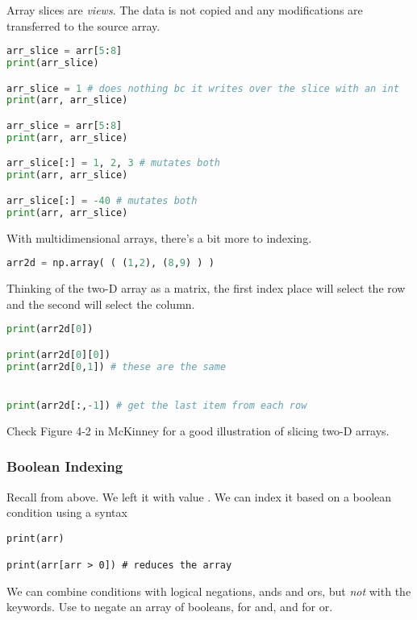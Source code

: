 \noindent Array slices are \emph{views}. The data is not copied and any modifications are transferred to the source array.

\begin{lstlisting}[language = Python]
arr_slice = arr[5:8]
print(arr_slice)

arr_slice = 1 # does nothing bc it writes over the slice with an int
print(arr, arr_slice)

arr_slice = arr[5:8]
print(arr, arr_slice)

arr_slice[:] = 1, 2, 3 # mutates both
print(arr, arr_slice)

arr_slice[:] = -40 # mutates both
print(arr, arr_slice)
\end{lstlisting}

\smallskip
\noindent With multidimensional arrays, there's a bit more to indexing.

\begin{lstlisting}[language = Python]
arr2d = np.array( ( (1,2), (8,9) ) ) 
\end{lstlisting}

Thinking of the two-D array as a matrix, the first index place will select the row and the second will select the column.

\begin{lstlisting}[language = Python]
print(arr2d[0])

print(arr2d[0][0])
print(arr2d[0,1]) # these are the same


print(arr2d[:,-1]) # get the last item from each row
\end{lstlisting}

\noindent Check Figure 4-2 in McKinney for a good illustration of slicing two-D arrays.


\subsubsection{Boolean Indexing}

Recall  from above. We left it with value . We can index it based on a boolean condition using a syntax 

\begin{lstlisting}
print(arr)

print(arr[arr > 0]) # reduces the array
\end{lstlisting}

We can combine conditions with logical negations, ands and ors, but \emph{not} with the  keywords. Use \code{\~} to negate an array of booleans, \code{&} for and, and \code{|} for or.

